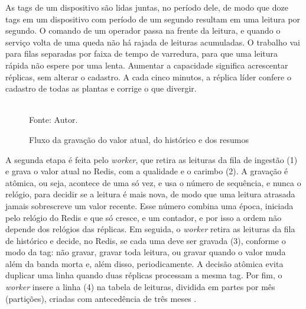 \par As tags de um dispositivo são lidas juntas, no período dele, de modo que doze tags em um dispositivo com período de um segundo resultam em uma leitura por segundo. O comando de um operador passa na frente da leitura, e quando o serviço volta de uma queda não há rajada de leituras acumuladas. O trabalho vai para filas separadas por faixa de tempo de varredura, para que uma leitura rápida não espere por uma lenta. Aumentar a capacidade significa acrescentar réplicas, sem alterar o cadastro. A cada cinco minutos, a réplica líder confere o cadastro de todas as plantas e corrige o que divergir.

\begin{figure}[H]
    \centering
    \caption{Fluxo da gravação do valor atual, do histórico e dos resumos}
    \label{fig:fx_campo_worker}
    \vspace{0.4cm}
    \vspace{0.2cm} \\
    Fonte: Autor.
\end{figure}

\par A segunda etapa é feita pelo \emph{worker}, que retira as leituras da fila de ingestão (1) e grava o valor atual no Redis, com a qualidade e o carimbo (2). A gravação é atômica, ou seja, acontece de uma só vez, e usa o número de sequência, e nunca o relógio, para decidir se a leitura é mais nova, de modo que uma leitura atrasada jamais sobrescreve um valor recente. Esse número combina uma época, iniciada pelo relógio do Redis e que só cresce, e um contador, e por isso a ordem não depende dos relógios das réplicas. Em seguida, o \emph{worker} retira as leituras da fila de histórico e decide, no Redis, se cada uma deve ser gravada (3), conforme o modo da tag: não gravar, gravar toda leitura, ou gravar quando o valor muda além da banda morta e, além disso, periodicamente. A decisão atômica evita duplicar uma linha quando duas réplicas processam a mesma tag. Por fim, o \emph{worker} insere a linha (4) na tabela de leituras, dividida em partes por mês (partições), criadas com antecedência de três meses \cite{POSTGRESQL_DOCS}.

